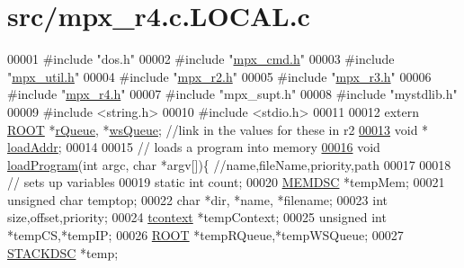 \hypertarget{mpx__r4_8c_8_l_o_c_a_l_8c_source}{
\section{src/mpx\_\-r4.c.LOCAL.c}
}

\begin{DoxyCode}
00001 \textcolor{preprocessor}{#include "dos.h"}
00002 \textcolor{preprocessor}{#include "\hyperlink{mpx__cmd_8h}{mpx_cmd.h}"}
00003 \textcolor{preprocessor}{#include "\hyperlink{mpx__util_8h}{mpx_util.h}"}
00004 \textcolor{preprocessor}{#include "\hyperlink{mpx__r2_8h}{mpx_r2.h}"}
00005 \textcolor{preprocessor}{#include "\hyperlink{_m_p_x___r3_8_h}{mpx_r3.h}"}
00006 \textcolor{preprocessor}{#include "\hyperlink{mpx__r4_8h}{mpx_r4.h}"}
00007 \textcolor{preprocessor}{#include "mpx\_supt.h"}
00008 \textcolor{preprocessor}{#include "mystdlib.h"}
00009 \textcolor{preprocessor}{#include <string.h>}
00010 \textcolor{preprocessor}{#include <stdio.h>}
00011 
00012 \textcolor{keyword}{extern} \hyperlink{structroot}{ROOT} *\hyperlink{mpx__r2_8c_afe54c168944e64a28d76b6e4d3abb391}{rQueue}, *\hyperlink{mpx__r2_8c_ac4950750e25f86d7ee69d6bcca87ef5f}{wsQueue}; \textcolor{comment}{//link in the values for these in r2}
\hypertarget{mpx__r4_8c_8_l_o_c_a_l_8c_source_l00013}{}\hyperlink{mpx__r4_8c_8_l_o_c_a_l_8c_a872ebd998619bdbaa3b905883e648502}{00013} \textcolor{keywordtype}{void} * \hyperlink{mpx__r4_8c_a872ebd998619bdbaa3b905883e648502}{loadAddr};
00014 
00015 \textcolor{comment}{// loads a program into memory}
\hypertarget{mpx__r4_8c_8_l_o_c_a_l_8c_source_l00016}{}\hyperlink{mpx__r4_8c_8_l_o_c_a_l_8c_a794e5f6c45d4d9b18fff6a530ce90f86}{00016} \textcolor{keywordtype}{void} \hyperlink{mpx__r4_8c_a794e5f6c45d4d9b18fff6a530ce90f86}{loadProgram}(\textcolor{keywordtype}{int} argc, \textcolor{keywordtype}{char} *argv[])\{ \textcolor{comment}{//name,fileName,priority,path}
00017         
00018         \textcolor{comment}{// sets up variables}
00019         \textcolor{keyword}{static} \textcolor{keywordtype}{int} count;
00020         \hyperlink{structmem}{MEMDSC} *tempMem;
00021         \textcolor{keywordtype}{unsigned} \textcolor{keywordtype}{char} temptop;
00022         \textcolor{keywordtype}{char} *dir, *name, *filename;
00023         \textcolor{keywordtype}{int} size,offset,priority;
00024         \hyperlink{structcontext}{tcontext} *tempContext;
00025         \textcolor{keywordtype}{unsigned} \textcolor{keywordtype}{int} *tempCS,*tempIP;
00026         \hyperlink{structroot}{ROOT} *tempRQueue,*tempWSQueue;
00027         \hyperlink{structstack}{STACKDSC} *temp;

\end{DoxyCode}
